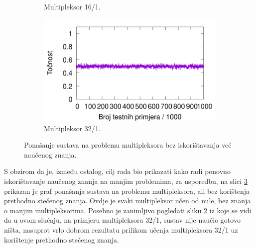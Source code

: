 \documentclass[times, utf8, zavrsni]{fer}
\begin{document}
\begin{figure}[!h]
\begin{subfigure}{0.496\textwidth}
        \caption{Multipleksor 16/1.}
        \label{fig:20muxnre}
    \end{subfigure}
    \begin{subfigure}{0.496\textwidth}
        \centering
        \includegraphics[width=\textwidth]{img/multiplexer/37muxnre.pdf}
        \caption{Multipleksor 32/1.}
        \label{fig:37muxnre}
    \end{subfigure}
    \caption{Ponašanje sustava na problemu multipleksora bez iskorištavanja već naučenog znanja.}
    \label{fig:muxnre}
\end{figure}
S obzirom da je, između ostalog, cilj rada bio prikazati kako radi ponovno iskorištavanje naučenog znanja na manjim problemima, za usporedbu, na slici \ref{fig:muxnre} prikazan je graf ponašanja sustava na problemu multipleksora, ali bez korištenja prethodno stečenog znanja.
Ovdje je svaki multipleksor učen od nule, bez znanja o manjim multipleksorima.
Posebno je zanimljivo pogledati sliku \ref{fig:37muxnre} iz koje se vidi da u ovom slučaju, na primjeru multipleksora 32/1, sustav nije naučio gotovo ništa, nasuprot vrlo dobrom rezultatu prilikom učenja multipleksora 32/1 uz korištenje prethodno stečenog znanja.
\end{document}
